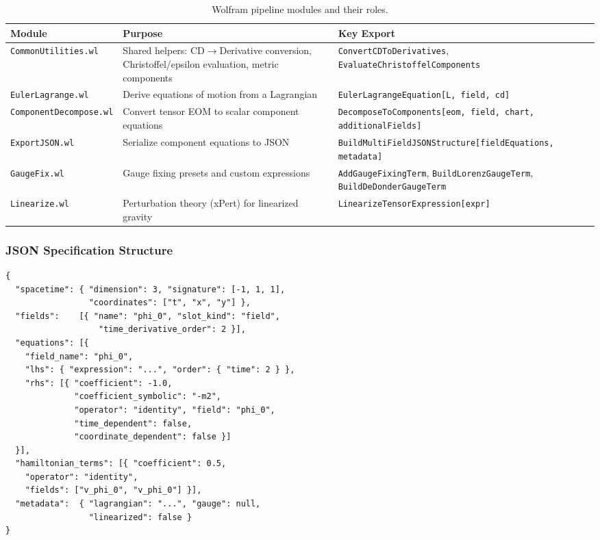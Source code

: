 \begin{table}[htbp]
\centering
\caption{Wolfram pipeline modules and their roles.}
\label{tab:wolfram-modules}
\begin{tabular}{@{}lll@{}}
\toprule
Module & Purpose & Key Export \\
\midrule
\texttt{CommonUtilities.wl} & Shared helpers: CD$\to$Derivative conversion, Christoffel/epsilon evaluation, metric components & \texttt{ConvertCDToDerivatives}, \texttt{EvaluateChristoffelComponents} \\
\texttt{EulerLagrange.wl} & Derive equations of motion from a Lagrangian & \texttt{EulerLagrangeEquation[L, field, cd]} \\
\texttt{ComponentDecompose.wl} & Convert tensor EOM to scalar component equations & \texttt{DecomposeToComponents[eom, field, chart, additionalFields]} \\
\texttt{ExportJSON.wl} & Serialize component equations to JSON & \texttt{BuildMultiFieldJSONStructure[fieldEquations, metadata]} \\
\texttt{GaugeFix.wl} & Gauge fixing presets and custom expressions & \texttt{AddGaugeFixingTerm}, \texttt{BuildLorenzGaugeTerm}, \texttt{BuildDeDonderGaugeTerm} \\
\texttt{Linearize.wl} & Perturbation theory (xPert) for linearized gravity & \texttt{LinearizeTensorExpression[expr]} \\
\bottomrule
\end{tabular}
\end{table}

\subsubsection{JSON Specification Structure}
\label{sec:json-spec-structure}

\begin{lstlisting}[style=json]
{
  "spacetime": { "dimension": 3, "signature": [-1, 1, 1],
                 "coordinates": ["t", "x", "y"] },
  "fields":    [{ "name": "phi_0", "slot_kind": "field",
                   "time_derivative_order": 2 }],
  "equations": [{
    "field_name": "phi_0",
    "lhs": { "expression": "...", "order": { "time": 2 } },
    "rhs": [{ "coefficient": -1.0,
              "coefficient_symbolic": "-m2",
              "operator": "identity", "field": "phi_0",
              "time_dependent": false,
              "coordinate_dependent": false }]
  }],
  "hamiltonian_terms": [{ "coefficient": 0.5,
    "operator": "identity",
    "fields": ["v_phi_0", "v_phi_0"] }],
  "metadata":  { "lagrangian": "...", "gauge": null,
                 "linearized": false }
}
\end{lstlisting}


